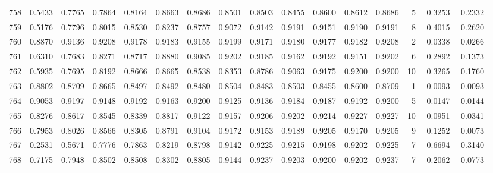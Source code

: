\begin{tabular}{lrrrrrrrrrrrrrrr}
758 &      0.5433 &  0.7765 &  0.7864 &  0.8164 &  0.8663 &  0.8686 &  0.8501 &  0.8503 &  0.8455 &  0.8600 &   0.8612 &     0.8686 &      5 &                    0.3253 &                     0.2332 \\
759 &      0.5176 &  0.7796 &  0.8015 &  0.8530 &  0.8237 &  0.8757 &  0.9072 &  0.9142 &  0.9191 &  0.9151 &   0.9190 &     0.9191 &      8 &                    0.4015 &                     0.2620 \\
760 &      0.8870 &  0.9136 &  0.9208 &  0.9178 &  0.9183 &  0.9155 &  0.9199 &  0.9171 &  0.9180 &  0.9177 &   0.9182 &     0.9208 &      2 &                    0.0338 &                     0.0266 \\
761 &      0.6310 &  0.7683 &  0.8271 &  0.8717 &  0.8880 &  0.9085 &  0.9202 &  0.9185 &  0.9162 &  0.9192 &   0.9151 &     0.9202 &      6 &                    0.2892 &                     0.1373 \\
762 &      0.5935 &  0.7695 &  0.8192 &  0.8666 &  0.8665 &  0.8538 &  0.8353 &  0.8786 &  0.9063 &  0.9175 &   0.9200 &     0.9200 &     10 &                    0.3265 &                     0.1760 \\
763 &      0.8802 &  0.8709 &  0.8665 &  0.8497 &  0.8492 &  0.8480 &  0.8504 &  0.8483 &  0.8503 &  0.8455 &   0.8600 &     0.8709 &      1 &                   -0.0093 &                    -0.0093 \\
764 &      0.9053 &  0.9197 &  0.9148 &  0.9192 &  0.9163 &  0.9200 &  0.9125 &  0.9136 &  0.9184 &  0.9187 &   0.9192 &     0.9200 &      5 &                    0.0147 &                     0.0144 \\
765 &      0.8276 &  0.8617 &  0.8545 &  0.8339 &  0.8817 &  0.9122 &  0.9157 &  0.9206 &  0.9202 &  0.9214 &   0.9227 &     0.9227 &     10 &                    0.0951 &                     0.0341 \\
766 &      0.7953 &  0.8026 &  0.8566 &  0.8305 &  0.8791 &  0.9104 &  0.9172 &  0.9153 &  0.9189 &  0.9205 &   0.9170 &     0.9205 &      9 &                    0.1252 &                     0.0073 \\
767 &      0.2531 &  0.5671 &  0.7776 &  0.7863 &  0.8219 &  0.8798 &  0.9142 &  0.9225 &  0.9215 &  0.9198 &   0.9202 &     0.9225 &      7 &                    0.6694 &                     0.3140 \\
768 &      0.7175 &  0.7948 &  0.8502 &  0.8508 &  0.8302 &  0.8805 &  0.9144 &  0.9237 &  0.9203 &  0.9200 &   0.9202 &     0.9237 &      7 &                    0.2062 &                     0.0773 \\

\end{tabular}
